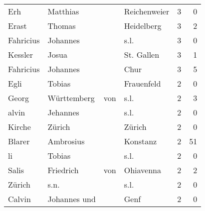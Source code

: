 \begin{center}
\begin{tiny}
\begin{longtabu}{llllrr}
                      Erh &                           Matthias &             &                                Reichenweier &          3 &         0 \\
                    Erast &                             Thomas &             &                                  Heidelberg &          3 &         2 \\
                Fahricius &                           Johannes &             &                                        s.l. &          3 &         0 \\
                  Kessler &                              Josua &             &                                  St. Gallen &          3 &         1 \\
                Fahricius &                           Johannes &             &                                        Chur &          3 &         5 \\
                     Egli &                             Tobias &             &                                  Frauenfeld &          2 &         0 \\
                    Georg &                        Württemberg &         von &                                        s.l. &          2 &         3 \\
                    alvin &                           Jehannes &             &                                        s.l. &          2 &         0 \\
                   Kirche &                             Zürich &             &                                      Zürich &          2 &         0 \\
                   Blarer &                          Ambrosius &             &                                    Konstanz &          2 &        51 \\
                       li &                             Tobias &             &                                        s.l. &          2 &         0 \\
                    Salis &                          Friedrich &         von &                                   Ohiavenna &          2 &         2 \\
                   Zürich &                               s.n. &             &                                        s.l. &          2 &         0 \\
                   Calvin &                       Johannes und &             &                                        Genf &          2 &         0 \\

\end{longtabu}
\end{tiny}
\end{center}
